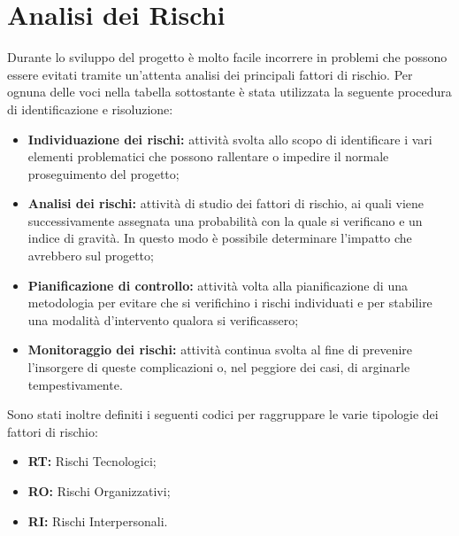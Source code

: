 \section{Analisi dei Rischi}
Durante lo sviluppo del progetto è molto facile incorrere in problemi che possono essere evitati tramite un'attenta analisi dei principali fattori di rischio.
Per ognuna delle voci nella tabella sottostante è stata utilizzata la seguente procedura di identificazione e risoluzione:

\begin{itemize}
    \item \textbf{Individuazione dei rischi: }attività svolta allo scopo di identificare i vari elementi problematici che possono rallentare o impedire il normale proseguimento del progetto;
    \item \textbf{Analisi dei rischi: }attività di studio dei fattori di rischio, ai quali viene successivamente assegnata una probabilità con la quale si verificano e un indice di gravità. In questo modo è possibile determinare l'impatto che avrebbero sul progetto;
    \item \textbf{Pianificazione di controllo: } attività volta alla pianificazione di una metodologia per evitare che si verifichino i rischi individuati e per stabilire una modalità d'intervento qualora si verificassero;
    \item \textbf{Monitoraggio dei rischi: }attività continua svolta al fine di prevenire l'insorgere di queste complicazioni o, nel peggiore dei casi, di arginarle tempestivamente.
\end{itemize} 

Sono stati inoltre definiti i seguenti codici per raggruppare le varie tipologie dei fattori di rischio:
\begin{itemize}
    \item \textbf{RT: }Rischi Tecnologici;
    \item \textbf{RO: }Rischi Organizzativi;
    \item \textbf{RI: }Rischi Interpersonali.
\end{itemize}


